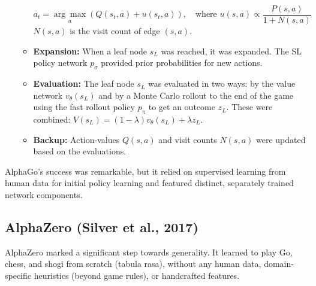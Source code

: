 \documentclass[11pt,a4paper]{article}
\begin{document}
\begin{itemize}
\begin{itemize}
        \begin{equation}
            a_t = \underset{a}{\arg\max} \left( Q(s_t, a) + u(s_t, a) \right), \quad \text{where } u(s,a) \propto \frac{P(s,a)}{1+N(s,a)}
        \end{equation}
        $N(s,a)$ is the visit count of edge $(s,a)$.
        \item \textbf{Expansion:} When a leaf node $s_L$ was reached, it was expanded. The SL policy network $p_{\sigma}$ provided prior probabilities for new actions.
        \item \textbf{Evaluation:} The leaf node $s_L$ was evaluated in two ways: by the value network $v_{\theta}(s_L)$ and by a Monte Carlo rollout to the end of the game using the fast rollout policy $p_{\pi}$ to get an outcome $z_L$. These were combined: $V(s_L) = (1-\lambda)v_{\theta}(s_L) + \lambda z_L$.
        \item \textbf{Backup:} Action-values $Q(s,a)$ and visit counts $N(s,a)$ were updated based on the evaluations.
    \end{itemize}
\end{itemize}
AlphaGo's success was remarkable, but it relied on supervised learning from human data for initial policy learning and featured distinct, separately trained network components.

\subsection{AlphaZero (Silver et al., 2017)~\cite{alphazero}}
AlphaZero marked a significant step towards generality. It learned to play Go, chess, and shogi from scratch (tabula rasa), without any human data, domain-specific heuristics (beyond game rules), or handcrafted features.
\end{document}
